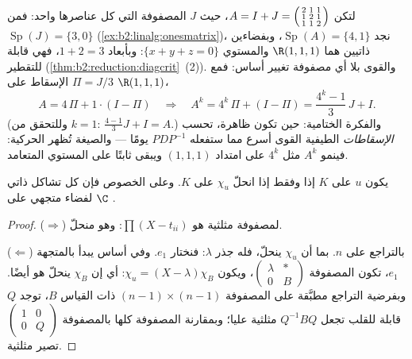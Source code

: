 \begin{example}\label{ex:b2:reduction:diagwork}
لتكن $A = I + J = \begin{psmallmatrix}2 & 1 & 1\\ 1 & 2 & 1\\ 1 & 1 &
2\end{psmallmatrix}$، حيث $J$ المصفوفة التي كل عناصرها واحد: فمن
$\operatorname{Sp}(J) = \{3, 0\}$
(\cref{ex:b2:linalg:onesmatrix})، نجد $\operatorname{Sp}(A) = \{4,
1\}$، وبفضاءين ذاتيين هما $\R(1,1,1)$ والمستوي $\{x + y + z =
0\}$: وبأبعاد $1 + 2 = 3$، فهي قابلة للتقطير
(\cref{thm:b2:reduction:diagcrit}~(2)). والقوى بلا أي
مصفوفة تغيير أساس: فمع $\Pi = J/3$ الإسقاط على
$\R(1,1,1)$،
\[
A = 4\,\Pi + 1\cdot(I - \Pi)
\quad\Longrightarrow\quad
A^k = 4^k\,\Pi + (I - \Pi)
= \frac{4^k - 1}{3}\,J + I .
\]
(وللتحقق من $k = 1$: $\frac{4-1}3 J + I = A$.) والفكرة الختامية:
حين تكون  ظاهرة، تحسب \emph{الإسقاطات} الطيفية
القوى أسرع مما ستفعله $PDP^{-1}$ يومًا --- والصيغة
تُظهر الحركية: فينمو $A^k$ مثل $4^k$ على امتداد
$(1,1,1)$ ويبقى ثابتًا على المستوي المتعامد.
\end{example}

\begin{theorem}[التثليث]\label{thm:b2:reduction:trigonalization}
يكون $u$  على $K$ إذا وفقط إذا انحلّ $\chi_u$ على
$K$. وعلى الخصوص فإن كل تشاكل ذاتي لفضاء متجهي على $\C$
.
\end{theorem}

\begin{proof}
($\Rightarrow$)  لمصفوفة مثلثية هو
$\prod(X - t_{ii})$: وهو منحلّ.

($\Leftarrow$) بالتراجع على $n$. بما أن $\chi_u$ ينحلّ، فله
جذر $\lambda$: فنختار  $e_1$. وفي أساس يبدأ بالمتجهة
$e_1$، تكون المصفوفة $\begin{pmatrix} \lambda & \ast\\ 0 &
B\end{pmatrix}$، ويكون $\chi_u = (X - \lambda)\chi_B$: أي إن $\chi_B$ ينحلّ
هو أيضًا. وبفرضية التراجع مطبَّقة على المصفوفة $(n-1) \times
(n-1)$ ذات القياس $B$، توجد $Q$ قابلة للقلب تجعل $Q^{-1}BQ$ مثلثية
عليا؛ وبمقارنة المصفوفة كلها بالمصفوفة $\begin{pmatrix}1 & 0\\
0 & Q\end{pmatrix}$ تصير مثلثية.
\end{proof}

